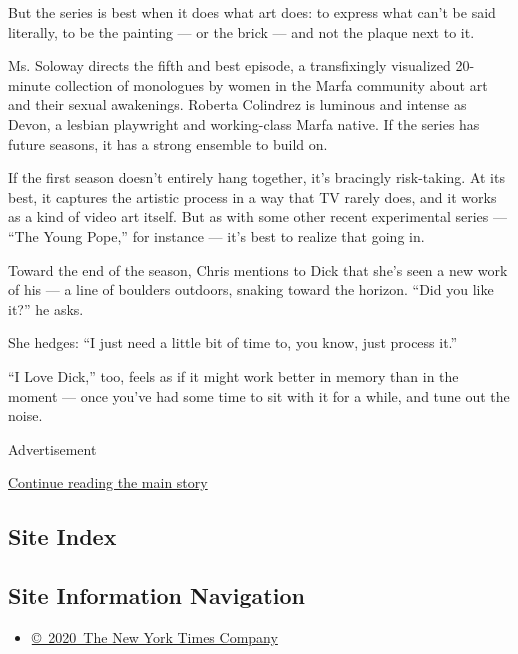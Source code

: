 But the series is best when it does what art does: to express what can't
be said literally, to be the painting --- or the brick --- and not the
plaque next to it.

Ms. Soloway directs the fifth and best episode, a transfixingly
visualized 20-minute collection of monologues by women in the Marfa
community about art and their sexual awakenings. Roberta Colindrez is
luminous and intense as Devon, a lesbian playwright and working-class
Marfa native. If the series has future seasons, it has a strong ensemble
to build on.

If the first season doesn't entirely hang together, it's bracingly
risk-taking. At its best, it captures the artistic process in a way that
TV rarely does, and it works as a kind of video art itself. But as with
some other recent experimental series --- ``The Young Pope,'' for
instance --- it's best to realize that going in.

Toward the end of the season, Chris mentions to Dick that she's seen a
new work of his --- a line of boulders outdoors, snaking toward the
horizon. ``Did you like it?'' he asks.

She hedges: ``I just need a little bit of time to, you know, just
process it.''

``I Love Dick,'' too, feels as if it might work better in memory than in
the moment --- once you've had some time to sit with it for a while, and
tune out the noise.

Advertisement

\protect\hyperlink{after-bottom}{Continue reading the main story}

\hypertarget{site-index}{%
\subsection{Site Index}\label{site-index}}

\hypertarget{site-information-navigation}{%
\subsection{Site Information
Navigation}\label{site-information-navigation}}

\begin{itemize}
\tightlist
\item
  \href{https://help.nytimes3xbfgragh.onion/hc/en-us/articles/115014792127-Copyright-notice}{©~2020~The
  New York Times Company}
\end{itemize}

